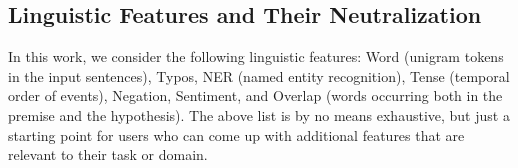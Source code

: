 %


\subsection{Linguistic Features and Their Neutralization}
\label{sec:features}

In this work, we consider the following linguistic features: 
Word (unigram tokens in the input sentences), 
Typos, NER (named entity recognition), 
Tense (temporal order of events), Negation, 
Sentiment, and Overlap (words occurring both in the premise and 
the hypothesis). 
The above list is by no means exhaustive, but just a starting point for users 
who can come up with additional features that are relevant
to their task or domain. 

